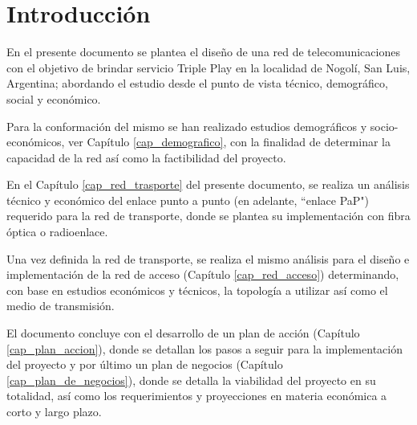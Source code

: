 \documentclass[12pt,a4paper]{book}
\begin{document}
\tableofcontents %

\renewcommand{\tablename}{Tabla}
\renewcommand{\figurename}{Fig.}

\renewcommand{\appendixname}{Anexos}
\renewcommand{\appendixtocname}{Anexos}
\renewcommand{\appendixpagename}{Anexos}

\listoffigures %

\listoftables %


\chapter{Introducción}

En el presente documento se plantea el diseño de una red de telecomunicaciones con el objetivo de brindar servicio Triple Play en la localidad de Nogolí, San Luis, Argentina; abordando el estudio desde el punto de vista técnico, demográfico, social y económico. 

\medskip 

Para la conformación del mismo se han realizado estudios demográficos y socio-económicos, ver Capítulo \ref{cap_demografico}, con la finalidad de determinar la capacidad de la red así como la factibilidad del proyecto.

\medskip 

En el Capítulo \ref{cap_red_trasporte} del presente documento, se realiza un análisis técnico y económico del enlace punto a punto (en adelante, ``enlace PaP") requerido para la red de transporte, donde se plantea su implementación con fibra óptica o radioenlace. 

\medskip 

Una vez definida la red de transporte, se realiza el mismo análisis para el diseño e implementación de la red de acceso (Capítulo \ref{cap_red_acceso}) determinando, con base en estudios económicos y técnicos, la topología a utilizar así como el medio de transmisión. 

\medskip 

El documento concluye con el desarrollo de un plan de acción (Capítulo \ref{cap_plan_accion}), donde se detallan los pasos a seguir para la implementación del proyecto y por último un plan de negocios (Capítulo \ref{cap_plan_de_negocios}), donde se detalla la viabilidad del proyecto en su totalidad, así como los requerimientos y proyecciones en materia económica a corto y largo plazo.
\end{document}
